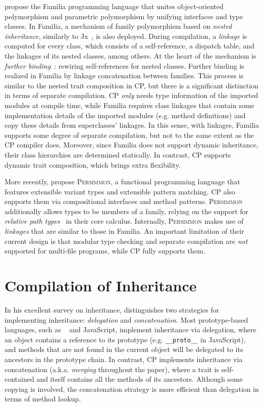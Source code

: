 \citet{zhang2017familia} propose the Familia programming language that unites
object-oriented polymorphism and parametric polymorphism by unifying interfaces
and type classes. In Familia, a mechanism of family polymorphism based on
\emph{nested inheritance}, similarly to Jx~\citep{nystrom2004scalable}, is also
deployed. During compilation, a \emph{linkage} is computed for every class,
which consists of a self-reference, a dispatch table, and the linkages of its
nested classes, among others. At the heart of the mechanism is \emph{further
binding}~\citep{madsen1993object}: rewiring self-references for nested classes.
Further binding is realized in Familia by linkage concatenation between
families. This process is similar to the nested trait composition in CP, but
there is a significant distinction in terms of separate compilation. CP
\emph{only} needs type information of the imported modules at compile time,
while Familia requires class linkages that contain some implementation details
of the imported modules (e.g. method definitions) and copy these details from
superclasses' linkages. In this sense, with linkages, Familia supports some
degree of separate compilation, but not to the same extent as the CP compiler
does. Moreover, since Familia does not support dynamic inheritance, their class
hierarchies are determined statically. In contrast, CP supports dynamic trait
composition, which brings extra flexibility.

More recently, \citet{kravchuk2024persimmon} propose \textsc{Persimmon}, a
functional programming language that features extensible variant types and
extensible pattern matching. CP also supports them via compositional interfaces
and method patterns. \textsc{Persimmon} additionally allows types to be members
of a family, relying on the support for \emph{relative path
types}~\citep{saito2008lightweight} in their core calculus. Internally,
\textsc{Persimmon} makes use of \emph{linkages} that are similar to those in
Familia. An important limitation of their current design is that modular type
checking and separate compilation are \emph{not} supported for multi-file
programs, while CP fully supports them.

\section{Compilation of Inheritance}

In his excellent survey on inheritance, \citet{taivalsaari1996notion}
distinguishes two strategies for implementing inheritance: \emph{delegation} and
\emph{concatenation}. Most prototype-based languages, such as
\self~\citep{ungar1987self} and JavaScript, implement inheritance via
delegation, where an object contains a reference to its prototype (e.g.
\lstinline{__proto__} in JavaScript), and methods that are not found in the
current object will be delegated to its ancestors in the prototype chain. In
contrast, CP implements inheritance via concatenation (a.k.a. \emph{merging}
throughout the paper), where a trait is self-contained and itself contains all
the methods of its ancestors. Although some copying is involved, the
concatenation strategy is more efficient than delegation in terms of method
lookup.

